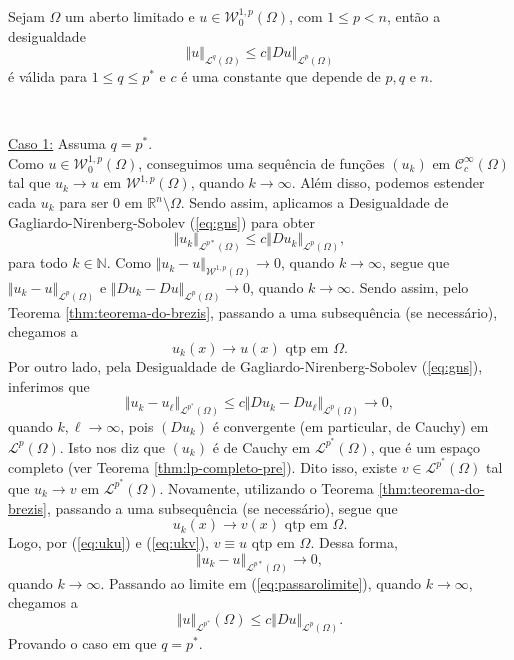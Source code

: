 \documentclass[a4paper, 11pt]{book}
\theoremstyle{definition}
\newcommand{\bN}{\mathbb{N}}
\newcommand{\bR}{\mathbb{R}}
\newcommand{\cC}{\mathcal{C}}
\newcommand{\cL}{\mathcal{L}}
\newcommand{\cW}{\mathcal{W}}
\begin{document}
\begin{tbox} \label{thm:poincaregen}
    Sejam $\Omega$ um aberto limitado e $u \in \cW^{1,p}_0(\Omega)$, com $1 \leqslant p < n$, então a desigualdade
    \begin{equation} \label{eq:poincaregen}
        \Vert u \Vert_{\cL^q(\Omega)} \leqslant c \Vert Du \Vert_{\cL^p(\Omega)}
    \end{equation}
    é válida para $1 \leqslant q \leqslant p^*$ e $c$ é uma constante que depende de $p, q$ e $n$.
\end{tbox}
\begin{prf} ~

    \underline{Caso 1:} Assuma $q = p^*$.\\
    Como $u \in \cW^{1,p}_0(\Omega)$, conseguimos uma sequência de funções $(u_k)$ em $\cC^{\infty}_c(\Omega)$ tal que $u_k \to u$ em $\cW^{1,p}(\Omega)$, quando $k \to \infty$.
    Além disso, podemos estender cada $u_k$ para ser $0$ em $\bR^n \setminus \Omega$.
    Sendo assim, aplicamos a Desigualdade de Gagliardo-Nirenberg-Sobolev (\ref{eq:gns}) para obter
    \begin{equation} \label{eq:passarolimite}
        \Vert u_k \Vert_{\cL^{p*}(\Omega)} \leqslant c \Vert Du_k \Vert_{\cL^p(\Omega)},
    \end{equation}
    para todo $k \in \bN$.
    Como $\Vert u_k - u \Vert_{\cW^{1,p}(\Omega)} \to 0$, quando $k \to \infty$, segue que $\Vert u_k - u \Vert_{\cL^p(\Omega)}$ e $\Vert Du_k - Du \Vert_{\cL^p(\Omega)} \to 0$, quando $k \to \infty$.
    Sendo assim, pelo Teorema \ref{thm:teorema-do-brezis}, passando a uma subsequência (se necessário), chegamos a
    \begin{equation} \label{eq:uku}
        u_k(x) \to u(x) \text{ qtp em } \Omega.
    \end{equation}
    Por outro lado, pela Desigualdade de Gagliardo-Nirenberg-Sobolev (\ref{eq:gns}), inferimos que
    \[
        \Vert u_k - u_\ell \Vert_{\cL^{p^*}(\Omega)} \leqslant c \Vert Du_k - Du_\ell \Vert_{\cL^p(\Omega)} \to 0,
    \]
    quando $k,\ell \to \infty$, pois $(Du_k)$ é convergente (em particular, de Cauchy) em $\cL^p(\Omega)$. Isto nos diz que $(u_k)$ é de Cauchy em $\cL^{p^*}(\Omega)$, que é um espaço completo (ver Teorema \ref{thm:lp-completo-pre}). Dito isso, existe $v \in \cL^{p^*}(\Omega)$ tal que $u_k \to v$ em $\cL^{p^*}(\Omega)$.
    Novamente, utilizando o Teorema \ref{thm:teorema-do-brezis}, passando a uma subsequência (se necessário), segue que
    \begin{equation} \label{eq:ukv}
        u_k(x) \to v(x) \text{ qtp em } \Omega.
    \end{equation}
    Logo, por (\ref{eq:uku}) e (\ref{eq:ukv}), $v \equiv u$ qtp em $\Omega$.
    Dessa forma,
    \[
        \Vert u_k - u \Vert_{\cL^{p*}(\Omega)} \to 0,
    \]
    quando $k \to \infty$.
    Passando ao limite em (\ref{eq:passarolimite}), quando $k\to\infty$, chegamos a
    \[
        \Vert u \Vert_{\cL^{p^*}}(\Omega) \leqslant c \Vert Du \Vert_{\cL^p(\Omega)}.
    \]
    Provando o caso em que $q = p^*$. 
    

\end{prf}
\end{document}
